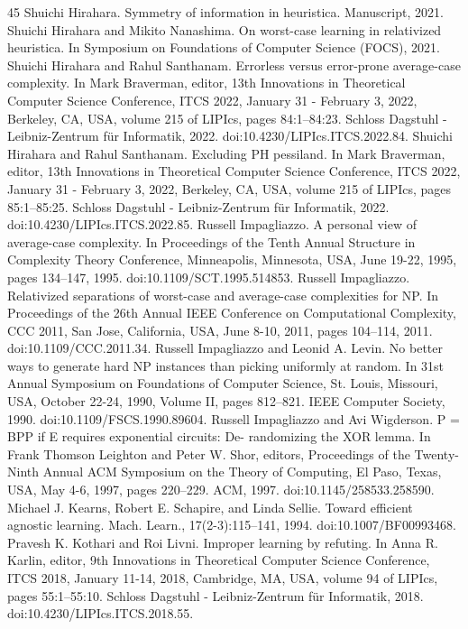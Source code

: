 \documentclass[10pt,a4paper]{article}
\begin{document}
\begin{thebibliography}{45}
 Shuichi Hirahara. Symmetry of information in heuristica. Manuscript, 2021.
 Shuichi Hirahara and Mikito Nanashima. On worst-case learning in relativized heuristica. In Symposium on Foundations of Computer Science (FOCS), 2021.
 Shuichi Hirahara and Rahul Santhanam. Errorless versus error-prone average-case complexity. In Mark Braverman, editor, 13th Innovations in Theoretical Computer Science Conference, ITCS 2022, January 31 - February 3, 2022, Berkeley, CA, USA, volume 215 of LIPIcs, pages 84:1–84:23. Schloss Dagstuhl - Leibniz-Zentrum für Informatik, 2022. doi:10.4230/LIPIcs.ITCS.2022.84.
 Shuichi Hirahara and Rahul Santhanam. Excluding PH pessiland. In Mark Braverman, editor, 13th Innovations in Theoretical Computer Science Conference, ITCS 2022, January 31 - February 3, 2022, Berkeley, CA, USA, volume 215 of LIPIcs, pages 85:1–85:25. Schloss Dagstuhl - Leibniz-Zentrum für Informatik, 2022. doi:10.4230/LIPIcs.ITCS.2022.85.
 Russell Impagliazzo. A personal view of average-case complexity. In Proceedings of the Tenth Annual Structure in Complexity Theory Conference, Minneapolis, Minnesota, USA, June 19-22, 1995, pages 134–147, 1995. doi:10.1109/SCT.1995.514853.
 Russell Impagliazzo. Relativized separations of worst-case and average-case complexities for NP. In Proceedings of the 26th Annual IEEE Conference on Computational Complexity, CCC 2011, San Jose, California, USA, June 8-10, 2011, pages 104–114, 2011. doi:10.1109/CCC.2011.34.
 Russell Impagliazzo and Leonid A. Levin. No better ways to generate hard NP instances than picking uniformly at random. In 31st Annual Symposium on Foundations of Computer Science, St. Louis, Missouri, USA, October 22-24, 1990, Volume II, pages 812–821. IEEE Computer Society, 1990. doi:10.1109/FSCS.1990.89604.
 Russell Impagliazzo and Avi Wigderson. P = BPP if E requires exponential circuits: De- randomizing the XOR lemma. In Frank Thomson Leighton and Peter W. Shor, editors, Proceedings of the Twenty-Ninth Annual ACM Symposium on the Theory of Computing, El Paso, Texas, USA, May 4-6, 1997, pages 220–229. ACM, 1997. doi:10.1145/258533.258590.
 Michael J. Kearns, Robert E. Schapire, and Linda Sellie. Toward efficient agnostic learning. Mach. Learn., 17(2-3):115–141, 1994. doi:10.1007/BF00993468.
 Pravesh K. Kothari and Roi Livni. Improper learning by refuting. In Anna R. Karlin, editor, 9th Innovations in Theoretical Computer Science Conference, ITCS 2018, January 11-14, 2018, Cambridge, MA, USA, volume 94 of LIPIcs, pages 55:1–55:10. Schloss Dagstuhl - Leibniz-Zentrum für Informatik, 2018. doi:10.4230/LIPIcs.ITCS.2018.55.

\end{thebibliography}
\end{document}
